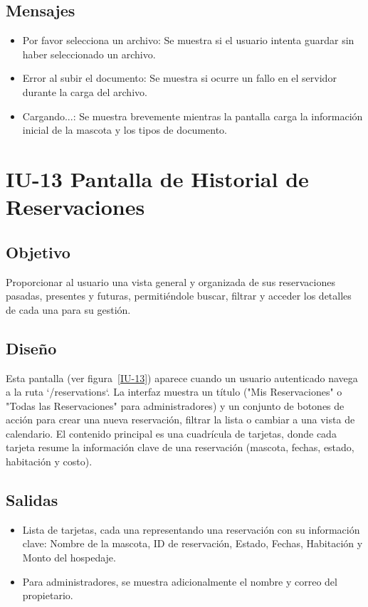 \subsection{Mensajes}
\begin{itemize}
    \item Por favor selecciona un archivo: Se muestra si el usuario intenta guardar sin haber seleccionado un archivo.
    \item Error al subir el documento: Se muestra si ocurre un fallo en el servidor durante la carga del archivo.
    \item Cargando...: Se muestra brevemente mientras la pantalla carga la información inicial de la mascota y los tipos de documento.
\end{itemize}

\section{IU-13 Pantalla de Historial de Reservaciones}

\subsection{Objetivo}
    Proporcionar al usuario una vista general y organizada de sus reservaciones pasadas, presentes y futuras, permitiéndole buscar, filtrar y acceder los detalles de cada una para su gestión.

\subsection{Diseño}
    Esta pantalla  (ver figura~\ref{IU-13}) aparece cuando un usuario autenticado navega a la ruta `/reservations`. La interfaz muestra un título ("Mis Reservaciones" o "Todas las Reservaciones" para administradores) y un conjunto de botones de acción para crear una nueva reservación, filtrar la lista o cambiar a una vista de calendario. El contenido principal es una cuadrícula de tarjetas, donde cada tarjeta resume la información clave de una reservación (mascota, fechas, estado, habitación y costo).


\subsection{Salidas}
\begin{itemize}
    \item Lista de tarjetas, cada una representando una reservación con su información clave: Nombre de la mascota, ID de reservación, Estado, Fechas, Habitación y Monto del hospedaje.
    \item Para administradores, se muestra adicionalmente el nombre y correo del propietario.
\end{itemize}

